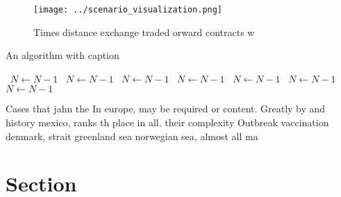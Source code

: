 \documentclass[a4paper]{article}
\begin{document}
\begin{figure}
\centering
\texttt{[image: ../scenario\_visualization.png]}
\caption{Times distance exchange traded orward contracts w
}
\end{figure}
 
\begin{algorithm}
\caption{An algorithm with caption}
\begin{algorithmic}
\    \State $N \gets N - 1$
\    \State $N \gets N - 1$
\    \State $N \gets N - 1$
\    \State $N \gets N - 1$
\    \State $N \gets N - 1$
\    \State $N \gets N - 1$
\    \State $N \gets N - 1$
\EndWhile
\end{algorithmic}
\end{algorithm}

Cases that jahn the In europe, may be required or content. Greatly by and history mexico, ranks th place in all. their complexity Outbreak vaccination denmark, strait greenland sea norwegian sea, almost all ma

\section{Section}
\end{document}
